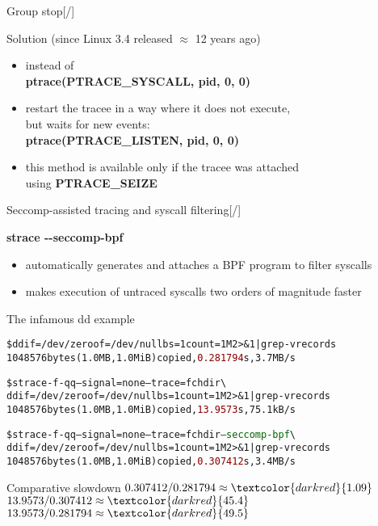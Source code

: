 \documentclass[unicode,aspectratio=169,xcolor={table,dvipsnames,usernames}]{beamer}
\begin{document}
\begin{frame}{\Large Group stop\hfill [\insertframenumber/\inserttotalframenumber]}
\Large
\begin{block}{Solution (since Linux 3.4 released $\approx$ 12 years ago)}
\begin{itemize}
	\item instead of \\
		\textbf{ptrace(PTRACE\_SYSCALL, pid, 0, 0)}
	\item restart the tracee in a way where it does not execute, \\
		but waits for new events: \\
		\textbf{ptrace(PTRACE\_LISTEN, pid, 0, 0)}
	\item this method is available only if the tracee was attached \\
		using \textbf{PTRACE\_SEIZE}
\end{itemize}
\end{block}
\end{frame}

\begin{frame}[fragile]{\Large Seccomp-assisted tracing and syscall filtering\hfill [\insertframenumber/\inserttotalframenumber]}
\begin{block}{\textbf{strace -{}-seccomp-bpf}}
\small
\begin{itemize}
	\item automatically generates and attaches a BPF program to filter syscalls
	\item makes execution of untraced syscalls two orders of magnitude faster
\end{itemize}
\end{block}

\begin{block}{The infamous dd example}
\scriptsize
\begin{alltt}
\$ dd if=/dev/zero of=/dev/null bs=1 count=1M 2>\&1 | grep -v records
1048576 bytes (1.0 MB, 1.0 MiB) copied, \textcolor{darkred}{0.281794} s, 3.7 MB/s

\$ strace -f -qq --signal=none --trace=fchdir \textbackslash
  dd if=/dev/zero of=/dev/null bs=1 count=1M 2>\&1 | grep -v records
1048576 bytes (1.0 MB, 1.0 MiB) copied, \textcolor{darkred}{13.9573} s, 75.1 kB/s

\$ strace -f -qq --signal=none --trace=fchdir \textcolor{darkgreen}{--seccomp-bpf} \textbackslash
  dd if=/dev/zero of=/dev/null bs=1 count=1M 2>\&1 | grep -v records
1048576 bytes (1.0 MB, 1.0 MiB) copied, \textcolor{darkred}{0.307412} s, 3.4 MB/s
\end{alltt}
\end{block}

\begin{block}{Comparative slowdown}
$0.307412 / 0.281794 \approx \textcolor{darkred}{1.09}$ \hfill
$13.9573 / 0.307412 \approx \textcolor{darkred}{45.4}$ \hfill
$13.9573 / 0.281794 \approx \textcolor{darkred}{49.5}$
\end{block}
\end{frame}
\end{document}
